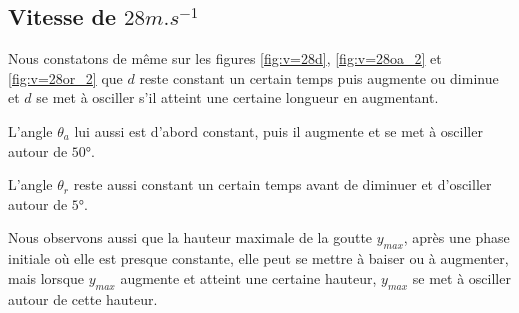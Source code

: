 \documentclass[french]{article}
\begin{document}
\subsection{Vitesse de $28m.s^{-1}$}
Nous constatons de même sur les figures \ref{fig:v=28d}, \ref{fig:v=28oa_2} et \ref{fig:v=28or_2} que $d$ reste constant un certain temps puis augmente ou diminue et $d$ se met à osciller s'il atteint une certaine longueur en augmentant.

L'angle $\theta_{a}$ lui aussi est d'abord constant, puis il augmente et se met à osciller autour de $\ang{50}$.

L'angle $\theta_{r}$ reste aussi constant un certain temps avant de diminuer et d'osciller autour de $\ang{5}$.

Nous observons aussi que la hauteur maximale de la goutte $y_{max}$, après une phase initiale où elle est presque constante, elle peut se mettre à baiser ou à augmenter, mais lorsque $y_{max}$ augmente et atteint une certaine hauteur, $y_{max}$ se met à osciller autour de cette hauteur.
\end{document}
